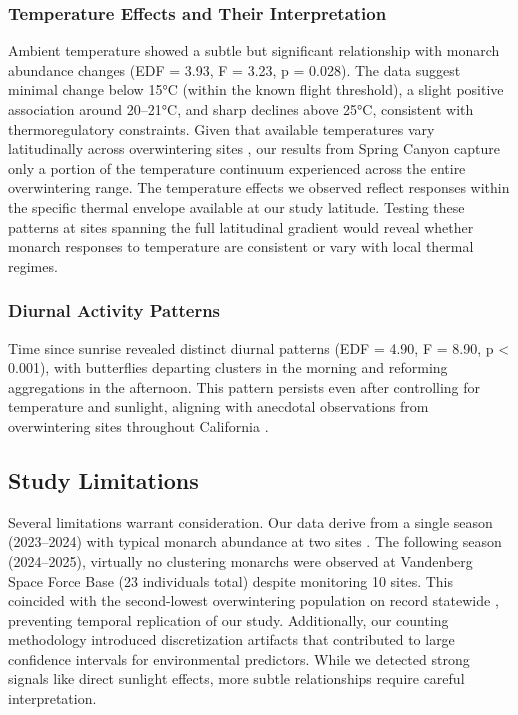 \subsubsection{Temperature Effects and Their Interpretation}

Ambient temperature showed a subtle but significant relationship with monarch abundance changes (EDF = 3.93, F = 3.23, p = 0.028). The data suggest minimal change below 15°C (within the known flight threshold), a slight positive association around 20--21°C, and sharp declines above 25°C, consistent with thermoregulatory constraints. Given that available temperatures vary latitudinally across overwintering sites \autocite{sanieeHierarchyScaleInfluence2022}, our results from Spring Canyon capture only a portion of the temperature continuum experienced across the entire overwintering range. The temperature effects we observed reflect responses within the specific thermal envelope available at our study latitude. Testing these patterns at sites spanning the full latitudinal gradient would reveal whether monarch responses to temperature are consistent or vary with local thermal regimes.

\subsubsection{Diurnal Activity Patterns}

Time since sunrise revealed distinct diurnal patterns (EDF = 4.90, F = 8.90, p < 0.001), with butterflies departing clusters in the morning and reforming aggregations in the afternoon. This pattern persists even after controlling for temperature and sunlight, aligning with anecdotal observations from overwintering sites throughout California \citep{tuskesOverwinteringEcologyMonarch1978,chaplinEnergyReservesMetabolic1982,freyCanMicrohabitatSelection1993}.

\subsection{Study Limitations}

Several limitations warrant consideration. Our data derive from a single season (2023--2024) with typical monarch abundance at two sites \citep{xercessocietyWesternMonarchThanksgiving2025}. The following season (2024--2025), virtually no clustering monarchs were observed at Vandenberg Space Force Base (23 individuals total) despite monitoring 10 sites. This coincided with the second-lowest overwintering population on record statewide \autocite{xercessocietyWesternMonarchButterfly2025}, preventing temporal replication of our study. Additionally, our counting methodology introduced discretization artifacts that contributed to large confidence intervals for environmental predictors. While we detected strong signals like direct sunlight effects, more subtle relationships require careful interpretation.


